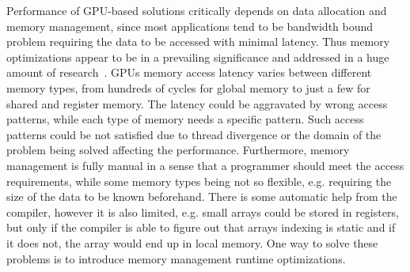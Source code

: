 \documentclass[sigplan]{acmart}\settopmatter{printacmref=false, printfolios=false}
\begin{document}
Performance of GPU-based solutions critically depends on data allocation and memory management, since most applications tend to be bandwidth bound problem requiring the data to be accessed with minimal latency.
Thus memory optimizations appear to be in a prevailing significance and addressed in a huge amount of research~\cite{10.1007/978-3-319-74313-4_27, Xie2018ICCADU, zhang2019efficient}.
GPUs memory access latency varies between different memory types, from hundreds of cycles for global memory to just a few for shared and register memory.
The latency could be aggravated by wrong access patterns, while each type of memory needs a specific pattern.
Such access patterns could be not satisfied due to thread divergence or the domain of the problem being solved affecting the performance.
Furthermore, memory management is fully manual in a sense that a programmer should meet the access requirements, while some memory types being not so flexible, e.g. requiring the size of the data to be known beforehand.
There is some automatic help from the compiler, however it is also limited, e.g. small arrays could be stored in registers, but only if the compiler is able to figure out that arrays indexing is static and if it does not, the array would end up in local memory.   
One way to solve these problems is to introduce memory management runtime optimizations.
\end{document}
